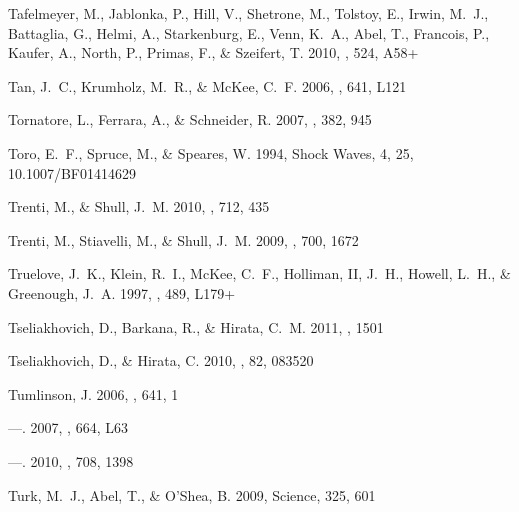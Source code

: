 \documentclass[12pt,preprint]{aastex}
\begin{document}
\begin{thebibliography}{108}
{Tafelmeyer}, M., {Jablonka}, P., {Hill}, V., {Shetrone}, M., {Tolstoy}, E.,
  {Irwin}, M.~J., {Battaglia}, G., {Helmi}, A., {Starkenburg}, E., {Venn},
  K.~A., {Abel}, T., {Francois}, P., {Kaufer}, A., {North}, P., {Primas}, F.,
  \& {Szeifert}, T. 2010, \aap, 524, A58+

{Tan}, J.~C., {Krumholz}, M.~R., \& {McKee}, C.~F. 2006, \apjl, 641, L121

{Tornatore}, L., {Ferrara}, A., \& {Schneider}, R. 2007, \mnras, 382, 945

Toro, E.~F., Spruce, M., \& Speares, W. 1994, Shock Waves, 4, 25,
  10.1007/BF01414629

{Trenti}, M., \& {Shull}, J.~M. 2010, \apj, 712, 435

{Trenti}, M., {Stiavelli}, M., \& {Shull}, J.~M. 2009, \apj, 700, 1672

{Truelove}, J.~K., {Klein}, R.~I., {McKee}, C.~F., {Holliman}, II, J.~H.,
  {Howell}, L.~H., \& {Greenough}, J.~A. 1997, \apjl, 489, L179+

{Tseliakhovich}, D., {Barkana}, R., \& {Hirata}, C.~M. 2011, \mnras, 1501

{Tseliakhovich}, D., \& {Hirata}, C. 2010, \prd, 82, 083520

{Tumlinson}, J. 2006, \apj, 641, 1

---. 2007, \apjl, 664, L63

---. 2010, \apj, 708, 1398

{Turk}, M.~J., {Abel}, T., \& {O'Shea}, B. 2009, Science, 325, 601


\end{thebibliography}
\end{document}
